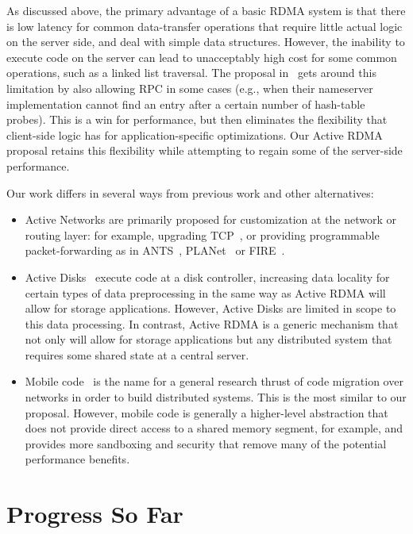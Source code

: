 \documentclass[10pt]{article}
\begin{document}
As discussed above, the primary advantage of a basic RDMA system is
that there is low latency for common data-transfer operations that
require little actual logic on the server side, and deal with simple
data structures. However, the inability to execute code on the server
can lead to unacceptably high cost for some common operations, such as
a linked list traversal. The proposal in~\cite{thekkath94} gets around
this limitation by also allowing RPC in some cases (e.g., when their
nameserver implementation cannot find an entry after a certain number
of hash-table probes). This is a win for performance, but then
eliminates the flexibility that client-side logic has for
application-specific optimizations. Our Active RDMA proposal retains
this flexibility while attempting to regain some of the server-side
performance.

Our work differs in several ways from previous work and other
alternatives:

\begin{itemize} \itemsep -2pt

\item Active Networks are primarily proposed for customization at the
  network or routing layer: for example, upgrading TCP~\cite{AN-tcp},
  or providing programmable packet-forwarding as in ANTS~\cite{ANTS},
  PLANet~\cite{planet} or FIRE~\cite{FIRE}.

\item Active Disks~\cite{AD2,AD} execute code at a disk controller,
  increasing data locality for certain types of data preprocessing in
  the same way as Active RDMA will allow for storage
  applications. However, Active Disks are limited in scope to this
  data processing. In contrast, Active RDMA is a generic mechanism
  that not only will allow for storage applications but any
  distributed system that requires some shared state at a central
  server.

\item Mobile code~\cite{mobile} is the name for a general research
  thrust of code migration over networks in order to build distributed
  systems. This is the most similar to our proposal. However, mobile
  code is generally a higher-level abstraction that does not provide
  direct access to a shared memory segment, for example, and provides
  more sandboxing and security that remove many of the potential
  performance benefits.

\end{itemize}

\section{Progress So Far}
\end{document}

